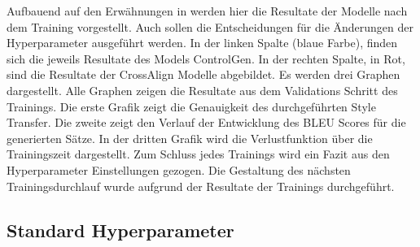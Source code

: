 Aufbauend auf den Erwähnungen in  werden hier die Resultate der Modelle nach dem
Training vorgestellt. Auch sollen die Entscheidungen für die Änderungen der Hyperparameter ausgeführt werden. 
\newline
\newline
In der linken Spalte (blaue Farbe), finden sich die jeweils Resultate des Models ControlGen. In der rechten
Spalte, in Rot, sind die Resultate der CrossAlign Modelle abgebildet. Es werden drei Graphen dargestellt. Alle
Graphen zeigen die Resultate aus dem Validations Schritt des Trainings. Die erste Grafik zeigt die Genauigkeit des
durchgeführten Style Transfer. Die zweite zeigt den Verlauf der Entwicklung des \gls{BLEU} Scores für die generierten
Sätze. In der dritten Grafik wird die Verlustfunktion über die Trainingszeit dargestellt. Zum Schluss jedes Trainings
wird ein Fazit aus den Hyperparameter Einstellungen gezogen. Die Gestaltung des nächsten Trainingsdurchlauf wurde
aufgrund der Resultate der Trainings durchgeführt.

\subsection{Standard Hyperparameter}
\label{sub:standard_hyperparameter}

